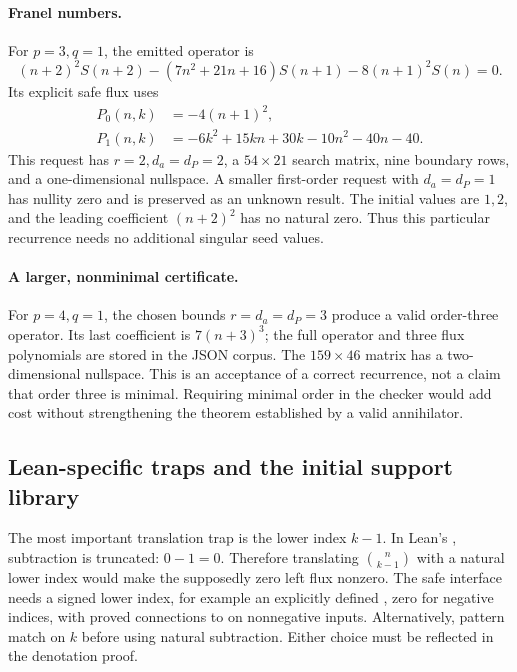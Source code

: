 \paragraph{Franel numbers.}
For $p=3,q=1$, the emitted operator is
\begin{equation}\label{eq:franel}
(n+2)^2S(n+2)-(7n^2+21n+16)S(n+1)-8(n+1)^2S(n)=0.
\end{equation}
Its explicit safe flux uses
\begin{align*}
P_0(n,k)&=-4(n+1)^2,\\
P_1(n,k)&=-6k^2+15kn+30k-10n^2-40n-40.
\end{align*}
This request has $r=2,d_a=d_P=2$, a $54\times21$ search matrix, nine boundary
rows, and a one-dimensional nullspace. A smaller first-order request with
$d_a=d_P=1$ has nullity zero and is preserved as an unknown result.
The initial values are $1,2$, and the leading coefficient $(n+2)^2$ has no
natural zero. Thus this particular recurrence needs no additional singular
seed values.

\paragraph{A larger, nonminimal certificate.}
For $p=4,q=1$, the chosen bounds $r=d_a=d_P=3$ produce a valid order-three
operator. Its last coefficient is $7(n+3)^3$; the full operator and three flux
polynomials are stored in the JSON corpus. The $159\times46$ matrix has a
two-dimensional nullspace. This is an acceptance of a correct recurrence, not
a claim that order three is minimal. Requiring minimal order in the checker
would add cost without strengthening the theorem established by a valid
annihilator.

\subsection{Lean-specific traps and the initial support library}

The most important translation trap is the lower index $k-1$. In Lean's
, subtraction is truncated: $0-1=0$. Therefore translating
$\binom n{k-1}$ with a natural lower index would make the supposedly zero
left flux nonzero. The safe interface needs a signed lower index, for example
an explicitly defined , zero for negative
indices, with proved connections to  on nonnegative inputs.
Alternatively, pattern match on $k$ before using natural subtraction. Either
choice must be reflected in the denotation proof.

